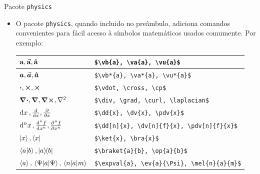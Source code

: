 \documentclass[c]{beamer}
\begin{document}
{\begin{frame}[fragile]{\sc Pacote \texttt{physics}}
\begin{itemize}
    \setlength\itemsep{0.3cm}
    \item O pacote {\color{blue}\verb|physics|}, quando incluido no preâmbulo, adiciona comandos convenientes para fácil acesso à símbolos matemáticos usados comumente. Por exemplo:
\begin{table}[h!]
  \centering
  \begin{adjustbox}{max width=\textwidth}
       \begin{tabular}{|l|l|}
        \hline
        $\vb{a}, \va{a}, \vu{a}$ & \verb|$\vb{a}, \va{a}, \vu{a}$|\\ %
        \hline
        $\vb*{a}, \va*{a}, \vu*{a}$& \verb|$\vb*{a}, \va*{a}, \vu*{a}$|\\%
        \hline
        $\vdot, \cross, \cp$ & \verb|$\vdot, \cross, \cp$|\\%
        \hline
        $\div, \grad, \curl, \laplacian$ & \verb|$\div, \grad, \curl, \laplacian$|\\%
        \hline
        $\dd{x}, \dv{x}, \pdv{x}$ & \verb|$\dd{x}, \dv{x}, \pdv{x}$|\\ %
        \hline
        $\dd[n]{x}, \dv[n]{f}{x}, \pdv[n]{f}{x}$ & \verb|$\dd[n]{x}, \dv[n]{f}{x}, \pdv[n]{f}{x}$|\\ %
        \hline
         $\ket{x}, \bra{x}$ & \verb|$\ket{x}, \bra{x}$|\\ %
        \hline
         $\braket{a}{b}, \op{a}{b}$ & \verb|$\braket{a}{b}, \op{a}{b}$| \\%
        \hline
             $\expval{a}, \ev{a}{\Psi}, \mel{n}{a}{m}$ & \verb|$\expval{a}, \ev{a}{\Psi}, \mel{n}{a}{m}$|\\ %
        \hline
        \end{tabular}
        \end{adjustbox}
\end{table}
\end{itemize}
\end{frame}

}
\end{document}
